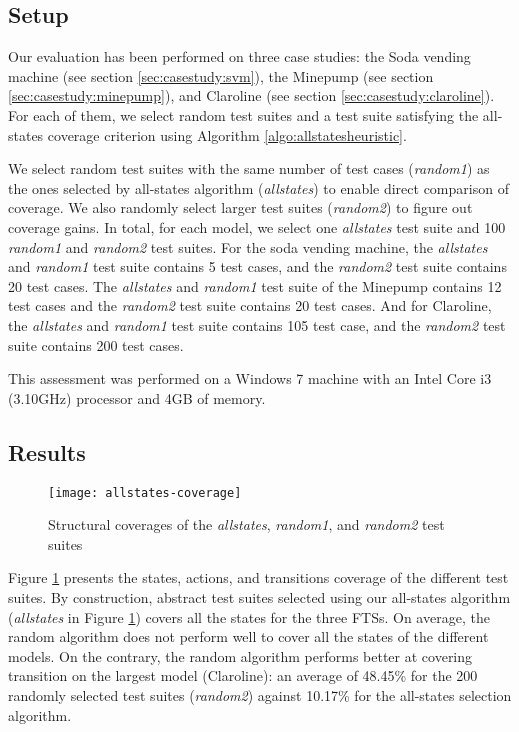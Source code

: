 \subsection{Setup}

Our evaluation has been performed on three case studies: the Soda vending machine (see section \ref{sec:casestudy:svm}), the Minepump (see section \ref{sec:casestudy:minepump}), and Claroline (see section \ref{sec:casestudy:claroline}). For each of them, we select random test suites and a test suite satisfying the all-states coverage criterion using Algorithm \ref{algo:allstatesheuristic}.

We select random test suites with the same number of test cases (\textit{random1}) as the ones selected by all-states algorithm (\textit{allstates}) to enable direct comparison of coverage. We also randomly select larger test suites (\textit{random2}) to figure out coverage gains. In total, for each model, we select one \textit{allstates} test suite and 100 \textit{random1} and \textit{random2} test suites. For the soda vending machine, the \textit{allstates} and \textit{random1} test suite contains 5 test cases, and the \textit{random2} test suite contains 20 test cases. The \textit{allstates} and \textit{random1} test suite of the Minepump contains 12 test cases and the \textit{random2} test suite contains 20 test cases. And for Claroline, the \textit{allstates} and \textit{random1} test suite contains 105 test case, and the \textit{random2} test suite contains 200 test cases. 

This assessment was performed on a Windows 7 machine with an Intel Core i3 (3.10GHz) processor and 4GB of memory. 

\subsection{Results}

\begin{figure}
	\centering
    \texttt{[image: allstates-coverage]}
	\caption{Structural coverages of the \textit{allstates}, \textit{random1}, and \textit{random2} test suites}
	\label{fig:allstatescoverage}
\end{figure}

Figure \ref{fig:allstatescoverage} presents the states, actions, and transitions coverage of the different test suites.  By construction, abstract test suites selected using our all-states algorithm (\textit{allstates} in Figure \ref{fig:allstatescoverage}) covers all the states for the three FTSs. On average, the random algorithm does not perform well to cover all the states of the different models.
On the contrary, the random algorithm performs better at covering transition on the largest model (Claroline): an average of 48.45\% for the 200 randomly selected test suites (\textit{random2}) against 10.17\% for the all-states selection algorithm.

